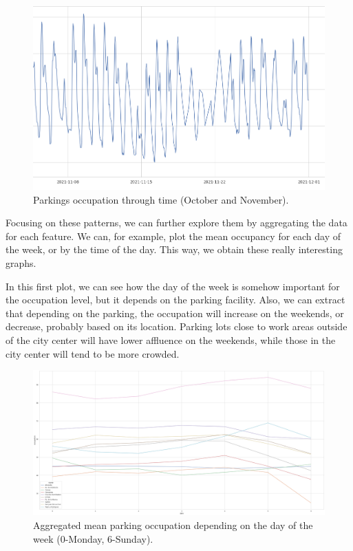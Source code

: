 \begin{figure}[H]
	\centering
	\includegraphics[width=1\linewidth]{imagenes/parking-mean-occupation-time.png}
	\caption{Parkings occupation through time (October and November).}
	\label{parking-mean-occupation-time}
\end{figure}

Focusing on these patterns, we can further explore them by aggregating the data for each feature. We can, for example, plot the mean occupancy for each day of the week, or by the time of the day. This way, we obtain these really interesting graphs.

In this first plot, we can see how the day of the week is somehow important for the occupation level, but it depends on the parking facility. Also, we can extract that depending on the parking, the occupation will increase on the weekends, or decrease, probably based on its location. Parking lots close to work areas outside of the city center will have lower affluence on the weekends, while those in the city center will tend to be more crowded.

\begin{figure}[H]
	\centering
	\includegraphics[width=0.9\linewidth]{imagenes/aggregated-mean-occupation-week.png}
	\caption{Aggregated mean parking occupation depending on the day of the week (0-Monday, 6-Sunday).}
	\label{aggregated-mean-occupation-week}
\end{figure}

